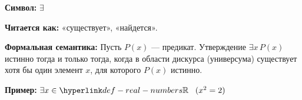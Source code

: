 
\hypertarget{def-exists}{}
\begin{definition} %

\textbf{Символ:} $\exists$

\textbf{Читается как:} «существует», «найдется».

\textbf{Формальная семантика:}
Пусть $P(x)$ — предикат. Утверждение $\exists x\, P(x)$ истинно тогда и только тогда,
когда в области дискурса (универсума) существует хотя бы один элемент $x$, для которого $P(x)$ истинно.

\textbf{Пример:} $\exists x \in \RealNumbers\; (x^2 = 2)$
\end{definition}